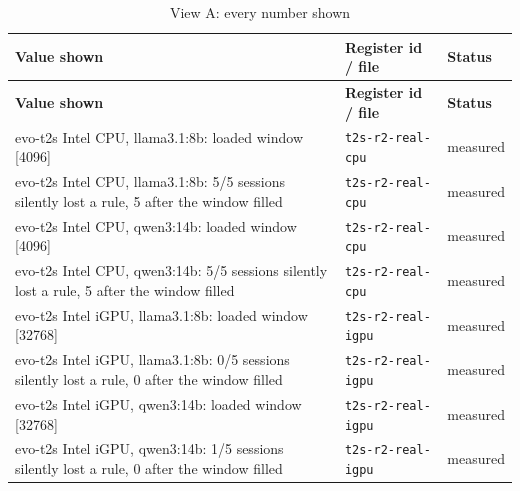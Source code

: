 \begin{longtable}{>{\raggedright\arraybackslash}p{}>{\raggedright\arraybackslash}p{}>{\raggedright\arraybackslash}p{}}
\caption{View A: every number shown}\label{tab:a}\\
\toprule
\textbf{Value shown} & \textbf{Register id / file} & \textbf{Status} \\
\midrule
\endfirsthead
\toprule
\textbf{Value shown} & \textbf{Register id / file} & \textbf{Status} \\
\midrule
\endhead
\small evo-t2s Intel CPU, llama3.1:8b: loaded window [4096] & {\footnotesize \texttt{t2s-\allowbreak{}r2-\allowbreak{}real-\allowbreak{}cpu}} & \small measured \\

\small evo-t2s Intel CPU, llama3.1:8b: 5/5 sessions silently lost a rule, 5 after the window filled & {\footnotesize \texttt{t2s-\allowbreak{}r2-\allowbreak{}real-\allowbreak{}cpu}} & \small measured \\

\small evo-t2s Intel CPU, qwen3:14b: loaded window [4096] & {\footnotesize \texttt{t2s-\allowbreak{}r2-\allowbreak{}real-\allowbreak{}cpu}} & \small measured \\

\small evo-t2s Intel CPU, qwen3:14b: 5/5 sessions silently lost a rule, 5 after the window filled & {\footnotesize \texttt{t2s-\allowbreak{}r2-\allowbreak{}real-\allowbreak{}cpu}} & \small measured \\

\small evo-t2s Intel iGPU, llama3.1:8b: loaded window [32768] & {\footnotesize \texttt{t2s-\allowbreak{}r2-\allowbreak{}real-\allowbreak{}igpu}} & \small measured \\

\small evo-t2s Intel iGPU, llama3.1:8b: 0/5 sessions silently lost a rule, 0 after the window filled & {\footnotesize \texttt{t2s-\allowbreak{}r2-\allowbreak{}real-\allowbreak{}igpu}} & \small measured \\

\small evo-t2s Intel iGPU, qwen3:14b: loaded window [32768] & {\footnotesize \texttt{t2s-\allowbreak{}r2-\allowbreak{}real-\allowbreak{}igpu}} & \small measured \\

\small evo-t2s Intel iGPU, qwen3:14b: 1/5 sessions silently lost a rule, 0 after the window filled & {\footnotesize \texttt{t2s-\allowbreak{}r2-\allowbreak{}real-\allowbreak{}igpu}} & \small measured \\


\end{longtable}
